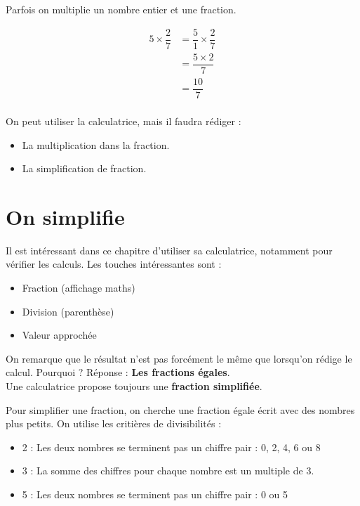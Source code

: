 \documentclass[12pt]{article}
\begin{document}
Parfois on multiplie un nombre entier et une fraction.

\begin{align*}
5 \times \dfrac{2}{7} &=  \dfrac{5}{1} \times \dfrac{2}{7}\\
				      &= \dfrac{5 \times 2}{7}\\
				      &= \dfrac{10}{7} \\			 
\end{align*}

On peut utiliser la calculatrice, mais il faudra rédiger :

\begin{itemize}
	\item La multiplication dans la fraction.
	\item La simplification de fraction.
\end{itemize}


\newpage

\section*{On simplifie}

Il est intéressant dans ce chapitre d'utiliser sa calculatrice, notamment pour vérifier les calculs. Les touches intéressantes sont : 

\begin{itemize}
	\item Fraction (affichage maths)
	\item Division (parenthèse)
	\item Valeur approchée
\end{itemize}

On remarque que le résultat n'est pas forcément le même que lorsqu'on rédige le calcul. Pourquoi ? Réponse : \textbf{Les fractions égales}.\\

Une calculatrice propose toujours une \textbf{fraction simplifiée}.

Pour simplifier une fraction, on cherche une fraction égale écrit avec des nombres plus petits. On utilise les critières de divisibilités :

\begin{itemize}
	\item 2 : Les deux nombres se terminent pas un chiffre pair : 0, 2, 4, 6 ou 8
	\item 3 : La somme des chiffres pour chaque nombre est un multiple de 3. 
	\item 5 : Les deux nombres se terminent pas un chiffre pair : 0 ou 5
\end{itemize}
\end{document}
